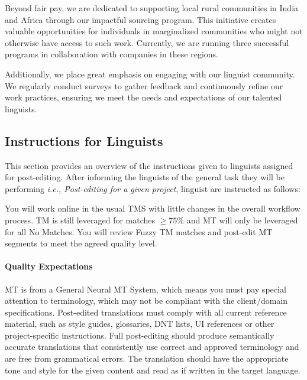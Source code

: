 \documentclass[11pt]{article}
\theoremstyle{plain}
\theoremstyle{definition}
\theoremstyle{remark}
\begin{document}
Beyond fair pay, we are dedicated to supporting local rural communities in India and Africa through our impactful sourcing program. This initiative creates valuable opportunities for individuals in marginalized communities who might not otherwise have access to such work. Currently, we are running three successful programs in collaboration with companies in these regions.
 
Additionally, we place great emphasis on engaging with our linguist community. We regularly conduct surveys to gather feedback and continuously refine our work practices, ensuring we meet the needs and expectations of our talented linguists. 

\subsection{Instructions for Linguists}
\label{sec:instructions}
This section provides an overview of the instructions given to linguists assigned for post-editing. After informing the linguists of the general task they will be performing \emph{i.e., Post-editing for a given project}, linguist are instructed as follows:

You will work online in the usual TMS with little changes in the overall workflow process.
TM is still leveraged for matches $\geq 75\%$ and MT will only be leveraged for all No Matches.
You will review Fuzzy TM matches and post-edit MT segments to meet the agreed quality level.


\paragraph{Quality Expectations} MT is from a General Neural MT System, which means you must pay special attention to terminology, which may not be compliant with the client/domain specifications.
Post-edited translations must comply with all current reference material, such as style guides, glossaries, DNT lists, UI references or other project-specific instructions.
Full post-editing should produce semantically accurate translations that consistently use correct and 
approved terminology and are free from grammatical errors.
The translation should have the appropriate tone and style for the given content and read as if written in the 
target language.
\end{document}

